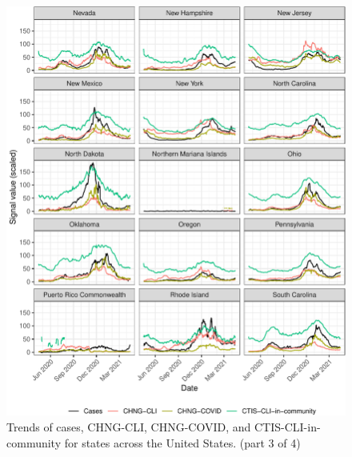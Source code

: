 \documentclass[9pt,twoside,lineno]{pnas-new}
\begin{document}
\begin{figure}

{\centering \includegraphics[width=\textwidth]{fig/state-trend-grids-3-1} 

}

\caption{Trends of cases, CHNG-CLI, CHNG-COVID, and CTIS-CLI-in-community for states across the United States. (part 3 of 4)}\label{fig:state-trend-grids-3}
\end{figure}

\clearpage
\end{document}
